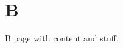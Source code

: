 \chapter{B }
\hypertarget{md__2comm_2docs_2md_2b}{}\label{md__2comm_2docs_2md_2b}
\label{md__2comm_2docs_2md_2b_autotoc_md1}%
%


B page with content and stuff. 